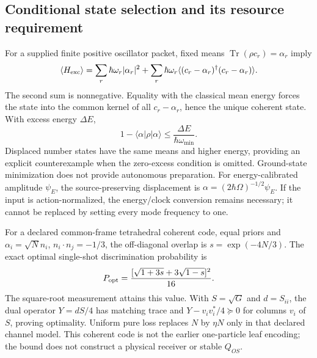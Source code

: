 \subsection{Conditional state selection and its resource requirement}
For a supplied finite positive oscillator packet, fixed means
$\operatorname{Tr}(\rho c_r)=\alpha_r$ imply
\begin{equation}
 \langle H_{\rm exc}\rangle=
 \sum_r\hbar\omega_r|\alpha_r|^2+
 \sum_r\hbar\omega_r
 \langle(c_r-\alpha_r)^\dagger(c_r-\alpha_r)\rangle.
\end{equation}
The second sum is nonnegative. Equality with the classical mean energy
forces the state into the common kernel of all $c_r-\alpha_r$, hence the
unique coherent state. With excess energy $\Delta E$,
\begin{equation}
 1-\langle\alpha|\rho|\alpha\rangle
 \leq \frac{\Delta E}{\hbar\omega_{\min}}.
\end{equation}
Displaced number states have the same means and higher energy, providing
an explicit counterexample when the zero-excess condition is omitted.
Ground-state minimization does not provide autonomous preparation.
For energy-calibrated amplitude $\psi_E$, the source-preserving displacement
is $\alpha=(2\hbar\Omega)^{-1/2}\psi_E$. If the input is action-normalized,
the energy/clock conversion remains necessary; it cannot be replaced by
setting every mode frequency to one.

For a declared common-frame tetrahedral coherent code, equal priors and
$\alpha_i=\sqrt{N}n_i$, $n_i\cdot n_j=-1/3$, the off-diagonal overlap is
$s=\exp(-4N/3)$. The exact optimal single-shot discrimination probability is
\begin{equation}
 P_{\rm opt}=\frac{[\sqrt{1+3s}+3\sqrt{1-s}]^2}{16}.
\end{equation}
The square-root measurement attains this value. With $S=\sqrt{G}$ and
$d=S_{ii}$, the dual operator $Y=dS/4$ has matching trace and
$Y-v_iv_i^*/4\succeq0$ for columns $v_i$ of $S$, proving optimality.
Uniform pure loss replaces $N$ by $\eta N$ only in that declared channel
model. This coherent code is not the earlier one-particle leaf encoding;
the bound does not construct a physical receiver or stable $Q_{OS}$.

